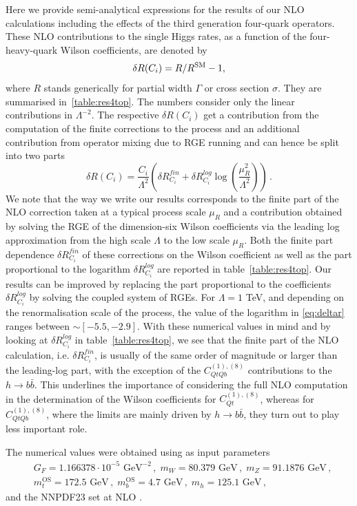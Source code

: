 Here we provide semi-analytical expressions for the results of our NLO calculations including the effects of the third generation four-quark operators. 
These NLO contributions to the single Higgs rates, as a function of the four-heavy-quark Wilson coefficients, are denoted by
\begin{equation}
	\delta R(C_i) = R/R^{\mathrm{SM}} -1,
	\label{eq:deltaR}
\end{equation}
where $R$ stands generically for partial width $\Gamma$ or cross section $\sigma$. They are summarised in~\autoref{table:res4top}. 
The numbers consider only the linear contributions in $\Lambda^{-2}$.  
The respective $\delta R(C_i) $ get a contribution from the computation of the finite corrections to the process and an additional contribution from operator mixing due to RGE running and can hence be split into two parts
\begin{equation}
	\delta R(C_i)= \frac{C_i}{\Lambda^2}\left(\delta R_{C_i}^{fin}+ \delta R_{C_i}^{log} \log\left(\frac{\mu_R^2}{\Lambda^2}\right)\right)\,.
	\label{eq:deltar}
\end{equation}
%
We note that the way we write our results corresponds to the finite part of the NLO correction taken at a typical process scale $\mu_R$ and a contribution obtained by solving the RGE of the dimension-six Wilson coefficients via the leading log approximation from the high scale $\Lambda$ to the low scale $\mu_R$.  Both the finite part dependence $\delta R_{C_i}^{fin}$ of these corrections on the  Wilson coefficient as well as the part proportional to the logarithm $\delta R_{C_i}^{log}$  are reported in table~\ref{table:res4top}.
Our results can be improved by replacing the part proportional to the coefficients  $\delta R^{log}_{C_i}$ by solving the coupled system of RGEs. 
For $ \Lambda =1$ TeV, and depending on the renormalisation scale of the process, the value of the logarithm in \eqref{eq:deltar} ranges between $\sim[-5.5,-2.9]$. With these numerical values in mind and by looking at $\delta R_{C_i}^{log}$ in table~\ref{table:res4top}, we see that the finite part of the NLO calculation, i.e. $\delta R_{C_i}^{fin}$, is usually of the same order  of magnitude or larger than the leading-log part, with the exception of the $C_{QtQb}^{(1),(8)}$ contributions to the $h\to b\bar{b}$. This underlines the importance of considering the full NLO computation in the determination of the Wilson coefficients for $C_{Qt}^{(1),(8)}$, whereas for $C_{QtQb}^{(1),(8)}$, where the limits are mainly driven by $h\to b\bar{b}$, they turn out to play less important role.

The numerical values were obtained using as input parameters
\begin{equation}
	\begin{split}
		& G_F=1.166378 \cdot 10^{-5} \text{ GeV}^{-2}\,,  \; m_W=80.379\text{ GeV}\,, \;m_Z=91.1876\text{ GeV}\,, \\ &  m_t^{\text{OS}}=172.5 \text{ GeV}\,, \; m_b^{\text{OS}}=4.7\text{ GeV}\,,  \;m_h=125.1\text{ GeV}\,,
	\end{split}
\end{equation}
and the NNPDF23 set at NLO \cite{Ball:2012cx}. 

